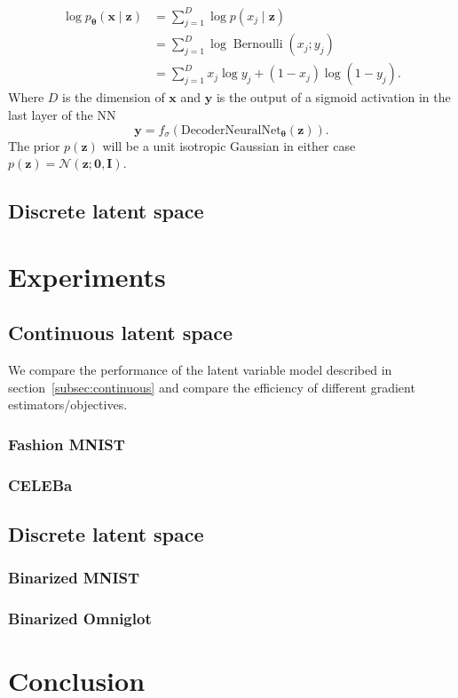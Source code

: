 \documentclass[final,3p,times,twocolumn]{elsarticle}
\begin{document}
\begin{equation}
	\label{eq:bernoulli}
	\begin{aligned} 
		\log p_{\boldsymbol{\theta}}(\mathbf{x} \mid \mathbf{z}) 
		&=\sum_{j=1}^{D} \log p\left(x_{j} \mid \mathbf{z}\right) \\ 
		&=\sum_{j=1}^{D} \log \operatorname{Bernoulli}\left(x_{j} ; y_{j}\right) \\ 
		&=\sum_{j=1}^{D} x_{j} \log y_{j}+\left(1-x_{j}\right) \log \left(1-y_{j}\right).
	\end{aligned}
\end{equation}
Where $D$ is the dimension of $\mathbf{x}$ and $\mathbf{y}$ is the output of a sigmoid activation in the last layer of the NN
\begin{equation}
	\mathbf{y}=f_{\sigma}\left(\text{DecoderNeuralNet}_{\boldsymbol{\theta}}(\mathbf{z})\right).
\end{equation}
The prior $p(\mathbf{z})$ will be a unit isotropic Gaussian in either case $p(\mathbf{z})=\mathcal{N}(\mathbf{z} ; \mathbf{0}, \mathbf{I})$. 

\subsection{Discrete latent space}
\label{subsec:discrete}


\section{Experiments}
\label{sec:results}
\subsection{Continuous latent space}
We compare the performance of the latent variable model described in section~\ref{subsec:continuous} and compare the efficiency of different gradient estimators/objectives.

\subsubsection{Fashion MNIST}
\subsubsection{CELEBa}

\subsection{Discrete latent space}
\subsubsection{Binarized MNIST}
\subsubsection{Binarized Omniglot}

\section{Conclusion}







\end{document}
